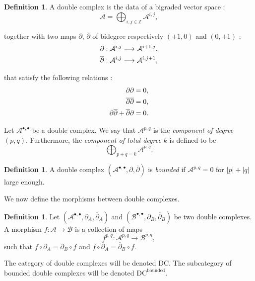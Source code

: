 \documentclass[leqno]{article}
\theoremstyle{definition}
\newtheorem{Definition}[equation]{Definition}
\numberwithin{equation}{section}
\begin{document}
\begin{Definition}
A double complex is the data of a bigraded vector space :
\[
\mathcal{A}
=
\bigoplus_{i, j \in \mathbb{Z}}
\mathcal{A}^{i, j},
\]

together with two maps $\partial$, $\overline{\partial}$ of bidegree respectively $( + 1, 0)$ and $(0, + 1)$ :
\[
\aligned
\partial
:
\mathcal{A}^{i, j}
\longrightarrow
\mathcal{A}^{i+1, j}, \\
\overline{\partial}
:
\mathcal{A}^{i, j}
\longrightarrow
\mathcal{A}^{i, j + 1},
\endaligned
\]

that satisfy the following relations : 
\[
\aligned
\partial \partial 
&=
0, \\
\overline{\partial} \overline{\partial}
&=
0, \\
\partial \overline{\partial} + \overline{\partial} \partial
&=
0.
\endaligned
\]

Let $\mathcal{A}^{\bullet, \bullet}$ be a double complex. We say that $\mathcal{A}^{p, q}$ is the {\sl component of degree} $(p, q)$. Furthermore, the {\sl component of total degree} $k$ is defined to be
\[
\bigoplus_{p+q=k}
\mathcal{A}^{p, q}.
\]
\end{Definition}
\begin{Definition}
A double complex $(\mathcal{A}^{\bullet, \bullet}, \partial, \overline{\partial})$ is {\sl bounded} if $\mathcal{A}^{p, q} = 0$ for $|p| + |q|$ large enough.
\end{Definition}
We now define the morphisms between double complexes.
\begin{Definition}
Let $(\mathcal{A}^{\bullet, \bullet}, \partial_A, \overline{\partial}_A)$ and $(\mathcal{B}^{\bullet, \bullet}, \partial_B, \overline{\partial}_B)$ be two double complexes. A morphism $f: \mathcal{A} \rightarrow \mathcal{B}$ is a collection of maps
\[
f^{p, q} : \mathcal{A}^{p, q} \longrightarrow \mathcal{B}^{p, q},
\]
such that $f \circ \partial_A = \partial_B \circ f$ and $f \circ \overline{\partial}_A = \overline{\partial}_B \circ f$.
\end{Definition}
The category of double complexes will be denoted $\text{DC}$. The subcategory of bounded double complexes will be denoted $\text{DC}^{\text{bounded}}$.
\end{document}
